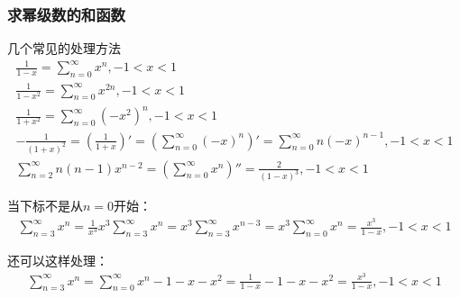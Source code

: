 \subsubsection{求幂级数的和函数}
几个常见的处理方法
\begin{gather*}
    \frac{1}{1-x}=\sum_{n=0}^{\infty} x^n,-1<x<1 \\
    \frac{1}{1-x^2}=\sum_{n=0}^{\infty} x^{2n},-1<x<1 \\
    \frac{1}{1+x^2}=\sum_{n=0}^{\infty} (-x^2)^n,-1<x<1 \\
    -\frac{1}{(1+x)^2}=\left( \frac{1}{1+x} \right)'=\left( \sum_{n=0}^{\infty} (-x)^n \right)'=\sum_{n=0}^{\infty} n(-x)^{n-1},-1<x<1\\
    \sum_{n=2}^{\infty} n(n-1)x^{n-2}=\left( \sum_{n=0}^{\infty} x^n \right)''=\frac{2}{(1-x)^3},-1<x<1
\end{gather*}

当下标不是从$n=0$开始：
\begin{gather*}
    \sum_{n=3}^{\infty} x^n=\frac{1}{x^3}x^3\sum_{n=3}^{\infty} x^n=x^3\sum_{n=3}^{\infty} x^{n-3}=x^3 \sum_{n=0}^{\infty} x^n=\frac{x^3}{1-x},-1<x<1
\end{gather*}

还可以这样处理：
\begin{gather*}
    \sum_{n=3}^{\infty} x^n=\sum_{n=0}^{\infty} x^n-1-x-x^2=\frac{1}{1-x}-1-x-x^2=\frac{x^3}{1-x},-1<x<1
\end{gather*}
